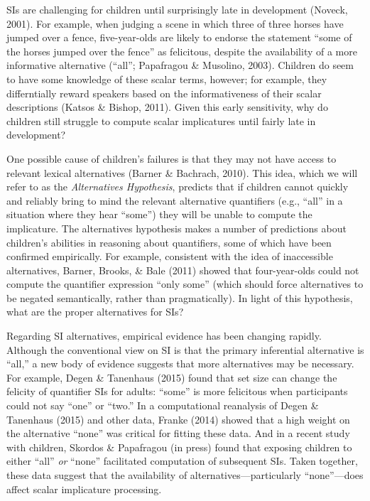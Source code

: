\documentclass[10pt, letterpaper]{article}
\begin{document}
SIs are challenging for children until surprisingly late in development
(Noveck, 2001). For example, when judging a scene in which three of
three horses have jumped over a fence, five-year-olds are likely to
endorse the statement ``some of the horses jumped over the fence'' as
felicitous, despite the availability of a more informative alternative
(``all''; Papafragou \& Musolino, 2003). Children do seem to have some
knowledge of these scalar terms, however; for example, they
differntially reward speakers based on the informativeness of their
scalar descriptions (Katsos \& Bishop, 2011). Given this early
sensitivity, why do children still struggle to compute scalar
implicatures until fairly late in development?

One possible cause of children's failures is that they may not have
access to relevant lexical alternatives (Barner \& Bachrach, 2010). This
idea, which we will refer to as the \emph{Alternatives Hypothesis},
predicts that if children cannot quickly and reliably bring to mind the
relevant alternative quantifiers (e.g., ``all'' in a situation where
they hear ``some'') they will be unable to compute the implicature. The
alternatives hypothesis makes a number of predictions about children's
abilities in reasoning about quantifiers, some of which have been
confirmed empirically. For example, consistent with the idea of
inaccessible alternatives, Barner, Brooks, \& Bale (2011) showed that
four-year-olds could not compute the quantifier expression ``only some''
(which should force alternatives to be negated semantically, rather than
pragmatically). In light of this hypothesis, what are the proper
alternatives for SIs?

Regarding SI alternatives, empirical evidence has been changing rapidly.
Although the conventional view on SI is that the primary inferential
alternative is ``all,'' a new body of evidence suggests that more
alternatives may be necessary. For example, Degen \& Tanenhaus (2015)
found that set size can change the felicity of quantifier SIs for
adults: ``some'' is more felicitous when participants could not say
``one'' or ``two.'' In a computational reanalysis of Degen \& Tanenhaus
(2015) and other data, Franke (2014) showed that a high weight on the
alternative ``none'' was critical for fitting these data. And in a
recent study with children, Skordos \& Papafragou (in press) found that
exposing children to either ``all'' \emph{or} ``none'' facilitated
computation of subsequent SIs. Taken together, these data suggest that
the availability of alternatives---particularly ``none''---does affect
scalar implicature processing.
\end{document}
